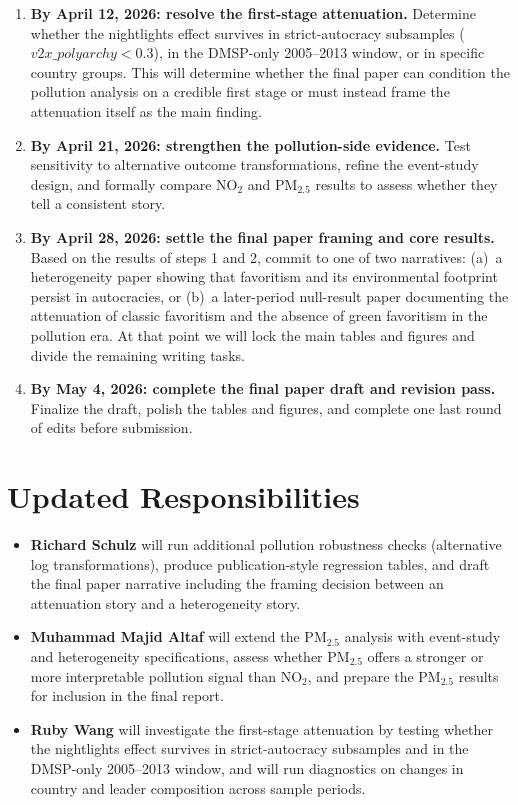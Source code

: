 \documentclass[11pt]{article}
\begin{document}
\begin{enumerate}[leftmargin=*]
    \item \textbf{By April 12, 2026: resolve the first-stage attenuation.} Determine whether the nightlights effect survives in strict-autocracy subsamples ($v2x\_polyarchy < 0.3$), in the DMSP-only 2005--2013 window, or in specific country groups. This will determine whether the final paper can condition the pollution analysis on a credible first stage or must instead frame the attenuation itself as the main finding.
    \item \textbf{By April 21, 2026: strengthen the pollution-side evidence.} Test sensitivity to alternative outcome transformations, refine the event-study design, and formally compare NO$_2$ and PM$_{2.5}$ results to assess whether they tell a consistent story.
    \item \textbf{By April 28, 2026: settle the final paper framing and core results.} Based on the results of steps 1 and 2, commit to one of two narratives: (a)~a heterogeneity paper showing that favoritism and its environmental footprint persist in autocracies, or (b)~a later-period null-result paper documenting the attenuation of classic favoritism and the absence of green favoritism in the pollution era. At that point we will lock the main tables and figures and divide the remaining writing tasks.
    \item \textbf{By May 4, 2026: complete the final paper draft and revision pass.} Finalize the draft, polish the tables and figures, and complete one last round of edits before submission.
\end{enumerate}

\section{Updated Responsibilities}

\begin{itemize}[leftmargin=*]
    \item \textbf{Richard Schulz} will run additional pollution robustness checks (alternative log transformations), produce publication-style regression tables, and draft the final paper narrative including the framing decision between an attenuation story and a heterogeneity story.
    \item \textbf{Muhammad Majid Altaf} will extend the PM$_{2.5}$ analysis with event-study and heterogeneity specifications, assess whether PM$_{2.5}$ offers a stronger or more interpretable pollution signal than NO$_2$, and prepare the PM$_{2.5}$ results for inclusion in the final report.
    \item \textbf{Ruby Wang} will investigate the first-stage attenuation by testing whether the nightlights effect survives in strict-autocracy subsamples and in the DMSP-only 2005--2013 window, and will run diagnostics on changes in country and leader composition across sample periods.
\end{itemize}
\end{document}
